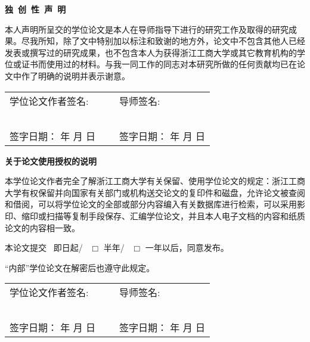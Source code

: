 {}
{
\songti
{}

\begin{center}
    \textbf{ \heiti 独~创~性~声~明}
\end{center}

本人声明所呈交的学位论文是本人在导师指导下进行的研究工作及取得的研究成果。尽我所知，除了文中特别加以标注和致谢的地方外，论文中不包含其他人已经发表或撰写过的研究成果，也不包含本人为获得浙江工商大学或其它教育机构的学位或证书而使用过的材料。与我一同工作的同志对本研究所做的任何贡献均已在论文中作了明确的说明并表示谢意。

\vskip 50pt

\begin{center}
     \songti 
    \begin{tabularx}{\linewidth}{ X c X }
        学位论文作者签名: & ~ &导师签名: \\
        ~ & ~ & ~ \\
        签字日期： \qquad 年 \qquad 月 \qquad 日 & ~ &
        签字日期： \qquad 年 \qquad 月 \qquad 日
    \end{tabularx}
\end{center}

\vskip 60pt

\begin{center}
    \textbf{  \heiti 关于论文使用授权的说明}
\end{center}


本学位论文作者完全了解浙江工商大学有关保留、使用学位论文的规定：浙江工商大学有权保留并向国家有关部门或机构送交论文的复印件和磁盘，允许论文被查阅和借阅，可以将学位论文的全部或部分内容编入有关数据库进行检索，可以采用影印、缩印或扫描等复制手段保存、汇编学位论文，并且本人电子文档的内容和纸质论文的内容相一致。

本论文提交~ \CheckedBox 即日起/~ $\Box$ 半年/~ $\Box$ 一年以后，同意发布。

“内部”学位论文在解密后也遵守此规定。
\vskip 50pt

\begin{center}
     \songti 
    \begin{tabularx}{\linewidth}{ X c X }
        学位论文作者签名: & ~ &导师签名: \\
        ~ & ~ & ~ \\
        签字日期： \qquad 年 \qquad 月 \qquad 日 & ~ &
        签字日期： \qquad 年 \qquad 月 \qquad 日
    \end{tabularx}
\end{center}

\vfill

}